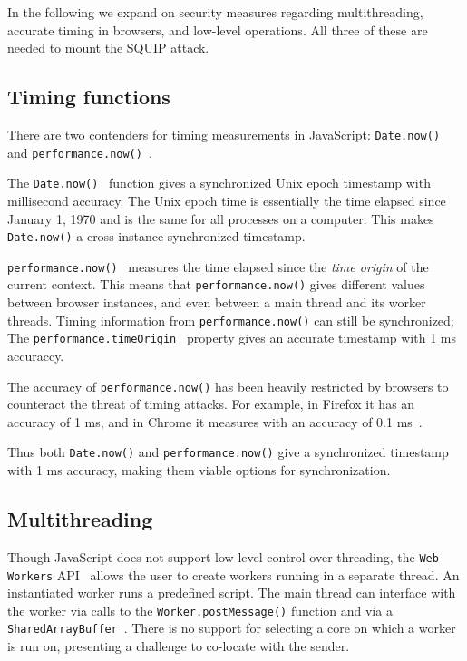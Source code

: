 \documentclass[11pt,
  titlepage=false,
]{scrreprt}
\begin{document}
In the following we expand on security measures regarding multithreading, accurate timing in browsers, and low-level operations.
All three of these are needed to mount the SQUIP attack.


\subsection{Timing functions}\label{subsec:timingjs}
There are two contenders for timing measurements in JavaScript: \texttt{Date.now()}~\cite{datenow} and \texttt{performance.now()}~\cite{performancenow}.

The \texttt{Date.now()}~\cite{datenow} function gives a synchronized Unix epoch timestamp with millisecond accuracy.
The Unix epoch time is essentially the time elapsed since January 1, 1970 and is the same for all processes on a computer.
This makes \texttt{Date.now()} a cross-instance synchronized timestamp.

\texttt{performance.now()}~\cite{performancenow} measures the time elapsed since the \textit{time origin} of the current context.
This means that \texttt{performance.now()} gives different values between browser instances, and even between a main thread and its worker threads.
Timing information from \texttt{performance.now()} can still be synchronized;
The \texttt{performance.timeOrigin}~\cite{performanceTimeOrigin} property gives an accurate timestamp with 1 ms accuraccy.

The accuracy of \texttt{performance.now()} has been heavily restricted by browsers to counteract the threat of timing attacks.
For example, in Firefox it has an accuracy of 1 ms, and in Chrome it measures with an accuracy of 0.1 ms~\cite{performancenow, performancenowchrome}.

Thus both \texttt{Date.now()} and \texttt{performance.now()} give a synchronized timestamp with 1 ms accuracy, making them viable options for synchronization.

\subsection{Multithreading}\label{subsec:multithreading}
Though JavaScript does not support low-level control over threading, the \texttt{Web Workers} API~\cite{webworkers} allows the user to create workers running in a separate thread.
An instantiated worker runs a predefined script.
The main thread can interface with the worker via calls to the \texttt{Worker.postMessage()} function and via a \texttt{SharedArrayBuffer}~\cite{sharedarraybuffer}.
There is no support for selecting a core on which a worker is run on, presenting a challenge to co-locate with the sender.
\end{document}
